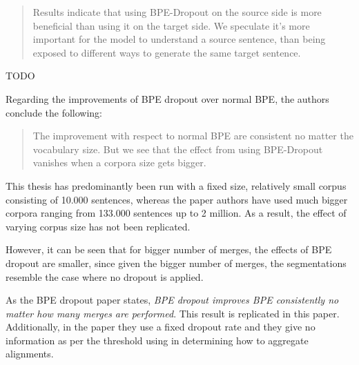 \begin{quote}
	Results indicate that using BPE-Dropout on the source side is more beneficial than using it on the target side. We speculate it's more important for the model to understand a source sentence, than being exposed to different ways to generate the same target sentence.
\end{quote}

TODO

Regarding the improvements of BPE dropout over normal BPE, the authors conclude the following:

\begin{quote}
	The improvement with respect to normal BPE are consistent no matter the vocabulary size. But we see that the effect from using BPE-Dropout vanishes when a corpora size gets bigger.
\end{quote}

This thesis has predominantly been run with a fixed size, relatively small corpus consisting of 10.000 sentences, whereas the paper authors have used much bigger corpora ranging from 133.000 sentences up to 2 million. As a result, the effect of varying corpus size has not been replicated. 

However, it can be seen that for bigger number of merges, the effects of BPE dropout are smaller, since given the bigger number of merges, the segmentations resemble the case where no dropout is applied.

As the BPE dropout paper states, \emph{BPE dropout improves BPE consistently no matter how many merges are performed}. This result is replicated in this paper. Additionally, in the paper they use a fixed dropout rate and they give no information as per the threshold using in determining how to aggregate alignments.


